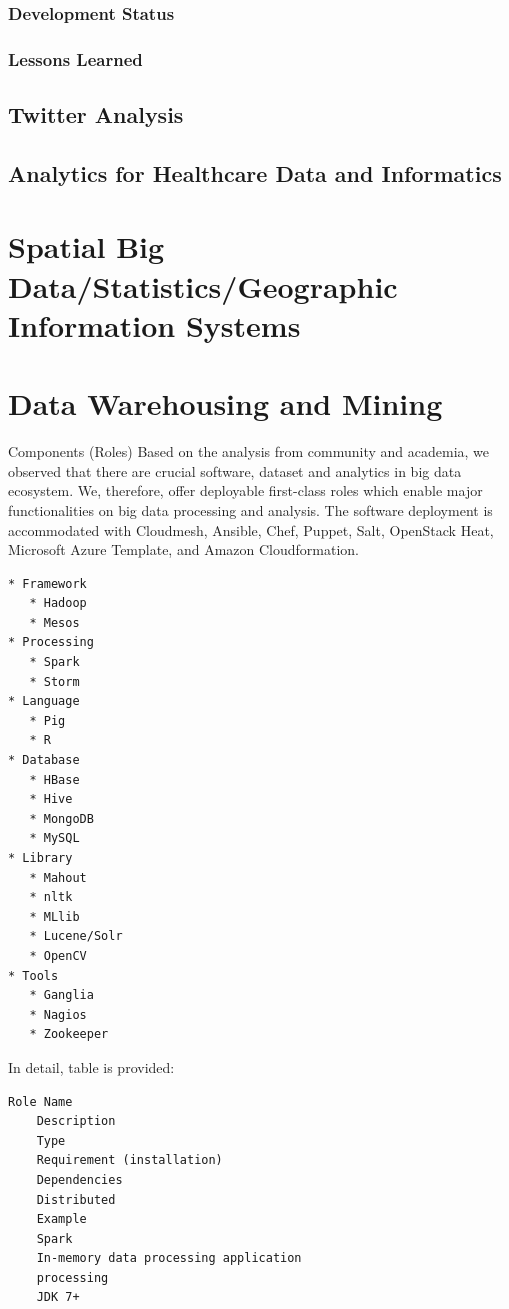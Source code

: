 \documentclass[9pt,twocolumn,twoside]{styles/osajnl}
\begin{document}
\subsubsection{Development Status}

\subsubsection{Lessons Learned}


\subsection{Twitter Analysis}


\subsection{Analytics for Healthcare Data and Informatics}

\section{Spatial Big Data/Statistics/Geographic Information Systems}

\section{Data Warehousing and Mining}

Components (Roles)
Based on the analysis from community and academia, we observed that there are crucial software, dataset and analytics in big data ecosystem. We, therefore, offer deployable first-class roles which enable major functionalities on big data processing and analysis. The software deployment is accommodated with Cloudmesh, Ansible, Chef, Puppet, Salt, OpenStack Heat, Microsoft Azure Template, and Amazon Cloudformation.

\begin{verbatim}
* Framework
   * Hadoop
   * Mesos
* Processing
   * Spark
   * Storm
* Language
   * Pig
   * R
* Database
   * HBase
   * Hive
   * MongoDB
   * MySQL
* Library
   * Mahout
   * nltk
   * MLlib
   * Lucene/Solr
   * OpenCV
* Tools
   * Ganglia
   * Nagios
   * Zookeeper
\end{verbatim}

In detail, table is provided:

\begin{verbatim}
Role Name
	Description
	Type
	Requirement (installation)
	Dependencies
	Distributed
	Example
	Spark
	In-memory data processing application
	processing
	JDK 7+
\end{verbatim}
\end{document}
